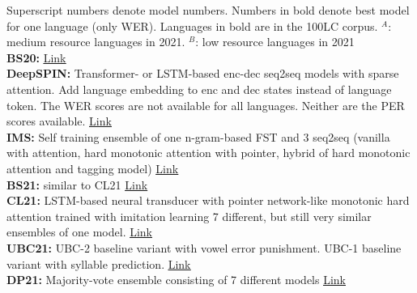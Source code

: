 \thispagestyle{empty}

{\small
\noindent
Superscript numbers denote model numbers. Numbers in bold denote best model for one language (only WER). Languages in bold are in the 100LC corpus. $^A$: medium resource languages in 2021. $^B$: low resource languages in 2021\\ 

\noindent
\textbf{BS20:} \href{https://aclanthology.org/2020.sigmorphon-1.2/}{\underline{Link}}\\
\textbf{DeepSPIN:} Transformer- or LSTM-based enc-dec seq2seq models with sparse attention. Add language embedding to enc and dec states instead of language token. The WER scores are not available for all languages. Neither are the PER scores available. \href{https://aclanthology.org/2020.sigmorphon-1.4/}{\underline{Link}}\\
\textbf{IMS:} Self training ensemble of one n-gram-based FST and 3 seq2seq (vanilla with attention, hard monotonic attention with pointer, hybrid of hard monotonic attention and tagging model) \href{https://aclanthology.org/2020.sigmorphon-1.5/}{\underline{Link}} \\
\textbf{BS21:} similar to CL21 \href{https://aclanthology.org/2021.sigmorphon-1.13/}{\underline{Link}}\\
\textbf{CL21:} LSTM-based neural transducer with pointer network-like monotonic hard attention trained with imitation learning 7 different, but still very similar ensembles of one model. \href{https://aclanthology.org/2021.sigmorphon-1.17/}{\underline{Link}}\\
\textbf{UBC21:} UBC-2 baseline variant with vowel error punishment. UBC-1 baseline variant with syllable prediction. \href{https://aclanthology.org/2021.sigmorphon-1.15/}{\underline{Link}}\\
\textbf{DP21:} Majority-vote ensemble consisting of 7 different models \href{https://aclanthology.org/2021.sigmorphon-1.16/}{\underline{Link}}
\noindent


}








